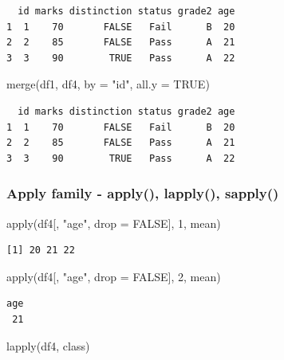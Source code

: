 \documentclass[
  letterpaper,
  DIV=11,
  numbers=noendperiod]{scrartcl}
\newenvironment{Shaded}{\begin{snugshade}}{\end{snugshade}}
\newcommand{\AttributeTok}[1]{\textcolor[rgb]{0.40,0.45,0.13}{#1}}
\newcommand{\ConstantTok}[1]{\textcolor[rgb]{0.56,0.35,0.01}{#1}}
\newcommand{\DecValTok}[1]{\textcolor[rgb]{0.68,0.00,0.00}{#1}}
\newcommand{\FunctionTok}[1]{\textcolor[rgb]{0.28,0.35,0.67}{#1}}
\newcommand{\NormalTok}[1]{\textcolor[rgb]{0.00,0.23,0.31}{#1}}
\newcommand{\StringTok}[1]{\textcolor[rgb]{0.13,0.47,0.30}{#1}}
\begin{document}
\begin{verbatim}
  id marks distinction status grade2 age
1  1    70       FALSE   Fail      B  20
2  2    85       FALSE   Pass      A  21
3  3    90        TRUE   Pass      A  22
\end{verbatim}

\begin{Shaded}
\begin{Highlighting}[]
\FunctionTok{merge}\NormalTok{(df1, df4, }\AttributeTok{by =} \StringTok{"id"}\NormalTok{, }\AttributeTok{all.y =} \ConstantTok{TRUE}\NormalTok{)}
\end{Highlighting}
\end{Shaded}

\begin{verbatim}
  id marks distinction status grade2 age
1  1    70       FALSE   Fail      B  20
2  2    85       FALSE   Pass      A  21
3  3    90        TRUE   Pass      A  22
\end{verbatim}

\subsubsection{Apply family - apply(), lapply(),
sapply()}\label{apply-family---apply-lapply-sapply}

\begin{Shaded}
\begin{Highlighting}[]
\FunctionTok{apply}\NormalTok{(df4[, }\StringTok{"age"}\NormalTok{, }\AttributeTok{drop =} \ConstantTok{FALSE}\NormalTok{], }\DecValTok{1}\NormalTok{, mean)}
\end{Highlighting}
\end{Shaded}

\begin{verbatim}
[1] 20 21 22
\end{verbatim}

\begin{Shaded}
\begin{Highlighting}[]
\FunctionTok{apply}\NormalTok{(df4[, }\StringTok{"age"}\NormalTok{, }\AttributeTok{drop =} \ConstantTok{FALSE}\NormalTok{], }\DecValTok{2}\NormalTok{, mean)}
\end{Highlighting}
\end{Shaded}

\begin{verbatim}
age 
 21 
\end{verbatim}

\begin{Shaded}
\begin{Highlighting}[]
\FunctionTok{lapply}\NormalTok{(df4, class)}
\end{Highlighting}
\end{Shaded}
\end{document}
